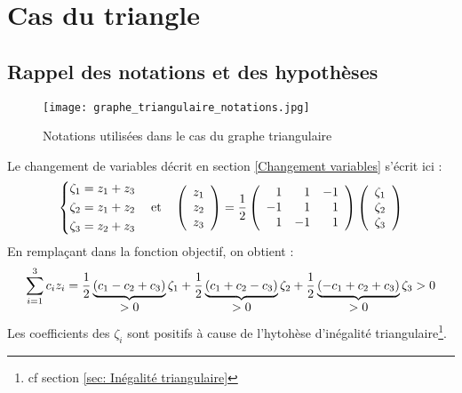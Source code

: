 \chapter{Cas du triangle}
\label{Cas du Triangle}

\section{Rappel des notations et des hypothèses}

\begin{figure}[ht]
  \label{Notation graphe triangulaire}
  \center \texttt{[image: graphe\_triangulaire\_notations.jpg]}
  \caption{Notations utilisées dans le cas du graphe triangulaire}
\end{figure}

Le changement de variables décrit en section \ref{Changement variables} s'écrit ici :
\begin{equation}\notag
  \left\{
    \begin{aligned}
      \zeta_1 &= z_1 + z_3 \\
      \zeta_2 &= z_1 + z_2 \\
      \zeta_3 &= z_2 + z_3
    \end{aligned}
  \right.
  \quad \mbox{et} \quad
  \left(
    \begin{array}{c}
      z_1 \\
      z_2 \\
      z_3
    \end{array}
  \right)
  = \frac{1}{2}
  \left(
    \begin{array}{rrr}
      1 & 1 & -1 \\
      -1 & 1 & 1 \\
      1 & -1 & 1
    \end{array}
  \right)
  \left(
    \begin{array}{c}
      \zeta_1 \\
      \zeta_2 \\
      \zeta_3
    \end{array}
  \right)
\end{equation}
En remplaçant dans la fonction objectif, on obtient :
\begin{equation}\notag
  \sum_{i=1}^3c_iz_i =
    \frac{1}{2} \underbrace{ \left(c_1 - c_2 + c_3 \right) }_{\displaystyle >0} \zeta_1
  + \frac{1}{2} \underbrace{ \left(c_1 + c_2 - c_3 \right) }_{\displaystyle >0} \zeta_2
  + \frac{1}{2} \underbrace{ \left(-c_1 + c_2 + c_3\right) }_{\displaystyle >0} \zeta_3 >0
\end{equation}
Les coefficients des $\zeta_i$ sont positifs à cause de l'hytohèse d'inégalité triangulaire\footnote{cf section \ref{sec: Inégalité triangulaire}}.
\\

